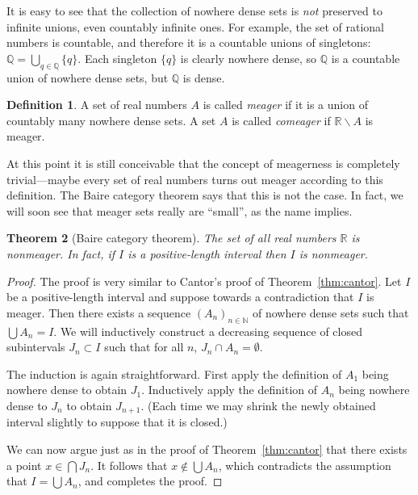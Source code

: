 \documentclass[11pt,oneside,a4paper]{amsbook}
\newcommand{\N}{\mathbb N}
\newcommand{\Q}{\mathbb Q}
\newcommand{\R}{\mathbb R}
\theoremstyle{definition}
\theoremstyle{plain}
\newtheorem{theorem}{Theorem}[section]
\theoremstyle{definition}
\newtheorem{definition}[theorem]{Definition}
\theoremstyle{remark}
\numberwithin{equation}{section}
\numberwithin{figure}{section}
\begin{document}
It is easy to see that the collection of nowhere dense sets is \emph{not} preserved to infinite unions, even countably infinite ones. For example, the set of rational numbers is countable, and therefore it is a countable unions of singletons: $\Q=\bigcup_{q\in\Q}\{q\}$. Each singleton $\{q\}$ is clearly nowhere dense, so $\Q$ is a countable union of nowhere dense sets, but $\Q$ is dense.

\begin{definition}
  A set of real numbers $A$ is called \emph{meager} if it is a union of countably many nowhere dense sets. A set $A$ is called \emph{comeager} if $\R\smallsetminus A$ is meager.
\end{definition}

At this point it is still conceivable that the concept of meagerness is completely trivial---maybe every set of real numbers turns out meager according to this definition. The Baire category theorem says that this is not the case. In fact, we will soon see that meager sets really are ``small'', as the name implies.

\begin{theorem}[Baire category theorem]
  \label{thm:baire}
  The set of all real numbers $\R$ is nonmeager. In fact, if $I$ is a positive-length interval then $I$ is nonmeager.
\end{theorem}

\begin{proof}
  The proof is very similar to Cantor's proof of Theorem~\ref{thm:cantor}. Let $I$ be a positive-length interval and suppose towards a contradiction that $I$ is meager. Then there exists a sequence $(A_n)_{n\in\N}$ of nowhere dense sets such that $\bigcup A_n=I$. We will inductively construct a decreasing sequence of closed subintervals $J_n\subset I$ such that for all $n$, $J_n\cap A_n=\emptyset$.

  The induction is again straightforward. First apply the definition of $A_1$ being nowhere dense to obtain $J_1$. Inductively apply the definition of $A_n$ being nowhere dense to $J_n$ to obtain $J_{n+1}$. (Each time we may shrink the newly obtained interval slightly to suppose that it is closed.)

  We can now argue just as in the proof of Theorem~\ref{thm:cantor} that there exists a point $x\in\bigcap J_n$. It follows that $x\notin\bigcup A_n$, which contradicts the assumption that $I=\bigcup A_n$, and completes the proof.
\end{proof}
\end{document}
